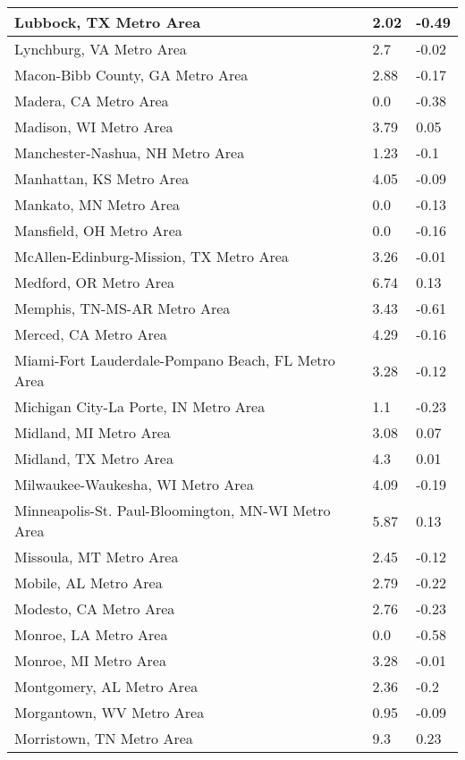 \documentclass[12pt,oneside, letterpaper]{book}
\begin{document}
\begin{longtable}{| p{} | p{} | p{} |}
    Lubbock, TX Metro Area & 2.02 & -0.49 \\ \hline
    Lynchburg, VA Metro Area & 2.7 & -0.02 \\ \hline
    Macon-Bibb County, GA Metro Area & 2.88 & -0.17 \\ \hline
    Madera, CA Metro Area & 0.0 & -0.38 \\ \hline
    Madison, WI Metro Area & 3.79 & 0.05 \\ \hline
    Manchester-Nashua, NH Metro Area & 1.23 & -0.1 \\ \hline
    Manhattan, KS Metro Area & 4.05 & -0.09 \\ \hline
    Mankato, MN Metro Area & 0.0 & -0.13 \\ \hline
    Mansfield, OH Metro Area & 0.0 & -0.16 \\ \hline
    McAllen-Edinburg-Mission, TX Metro Area & 3.26 & -0.01 \\ \hline
    Medford, OR Metro Area & 6.74 & 0.13 \\ \hline
    Memphis, TN-MS-AR Metro Area & 3.43 & -0.61 \\ \hline
    Merced, CA Metro Area & 4.29 & -0.16 \\ \hline
    Miami-Fort Lauderdale-Pompano Beach, FL Metro Area & 3.28 & -0.12 \\ \hline
    Michigan City-La Porte, IN Metro Area & 1.1 & -0.23 \\ \hline
    Midland, MI Metro Area & 3.08 & 0.07 \\ \hline
    Midland, TX Metro Area & 4.3 & 0.01 \\ \hline
    Milwaukee-Waukesha, WI Metro Area & 4.09 & -0.19 \\ \hline
    Minneapolis-St. Paul-Bloomington, MN-WI Metro Area & 5.87 & 0.13 \\ \hline
    Missoula, MT Metro Area & 2.45 & -0.12 \\ \hline
    Mobile, AL Metro Area & 2.79 & -0.22 \\ \hline
    Modesto, CA Metro Area & 2.76 & -0.23 \\ \hline
    Monroe, LA Metro Area & 0.0 & -0.58 \\ \hline
    Monroe, MI Metro Area & 3.28 & -0.01 \\ \hline
    Montgomery, AL Metro Area & 2.36 & -0.2 \\ \hline
    Morgantown, WV Metro Area & 0.95 & -0.09 \\ \hline
    Morristown, TN Metro Area & 9.3 & 0.23 \\ \hline

\end{longtable}
\end{document}
